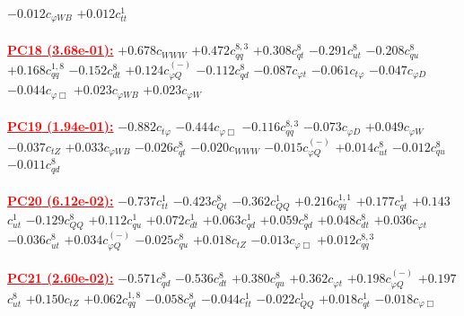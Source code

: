 \documentclass{article}
\begin{document}
{$-0.012$}{\rm $c_{\varphi WB}$} 
{$+0.012$}{\rm $c_{tt}^{1}$} 
 \nonumber \\ \nonumber \\ 
\noindent \textcolor{red}{\underline{\bf{PC18} (3.68e-01):}}
{$+0.678$}{\rm $c_{WWW}$} 
{$+0.472$}{\rm $c_{qq}^{8,3}$} 
{$+0.308$}{\rm $c_{qt}^{8}$} 
{$-0.291$}{\rm $c_{ut}^{8}$} 
{$-0.208$}{\rm $c_{qu}^{8}$} 
{$+0.168$}{\rm $c_{qq}^{1,8}$} 
{$-0.152$}{\rm $c_{dt}^{8}$} 
{$+0.124$}{\rm $c_{\varphi Q}^{(-)}$} 
{$-0.112$}{\rm $c_{qd}^{8}$} 
{$-0.087$}{\rm $c_{\varphi t}$} 
{$-0.061$}{\rm $c_{t \varphi}$} 
{$-0.047$}{\rm $c_{\varphi D}$} 
{$-0.044$}{\rm $c_{\varphi \Box}$} 
{$+0.023$}{\rm $c_{\varphi WB}$} 
{$+0.023$}{\rm $c_{\varphi W}$} 
 \nonumber \\ \nonumber \\ 
\noindent \textcolor{red}{\underline{\bf{PC19} (1.94e-01):}}
{$-0.882$}{\rm $c_{t \varphi}$} 
{$-0.444$}{\rm $c_{\varphi \Box}$} 
{$-0.116$}{\rm $c_{qq}^{8,3}$} 
{$-0.073$}{\rm $c_{\varphi D}$} 
{$+0.049$}{\rm $c_{\varphi W}$} 
{$-0.037$}{\rm $c_{tZ}$} 
{$+0.033$}{\rm $c_{\varphi WB}$} 
{$-0.026$}{\rm $c_{qt}^{8}$} 
{$-0.020$}{\rm $c_{WWW}$} 
{$-0.015$}{\rm $c_{\varphi Q}^{(-)}$} 
{$+0.014$}{\rm $c_{ut}^{8}$} 
{$-0.012$}{\rm $c_{qu}^{8}$} 
{$-0.011$}{\rm $c_{qd}^{8}$} 
 \nonumber \\ \nonumber \\ 
\noindent \textcolor{red}{\underline{\bf{PC20} (6.12e-02):}}
{$-0.737$}{\rm $c_{tt}^{1}$} 
{$-0.423$}{\rm $c_{Qt}^{8}$} 
{$-0.362$}{\rm $c_{QQ}^{1}$} 
{$+0.216$}{\rm $c_{qq}^{1,1}$} 
{$+0.177$}{\rm $c_{qt}^{1}$} 
{$+0.143$}{\rm $c_{ut}^{1}$} 
{$-0.129$}{\rm $c_{QQ}^{8}$} 
{$+0.112$}{\rm $c_{qu}^{1}$} 
{$+0.072$}{\rm $c_{dt}^{1}$} 
{$+0.063$}{\rm $c_{qd}^{1}$} 
{$+0.059$}{\rm $c_{qd}^{8}$} 
{$+0.048$}{\rm $c_{dt}^{8}$} 
{$+0.036$}{\rm $c_{\varphi t}$} 
{$-0.036$}{\rm $c_{ut}^{8}$} 
{$+0.034$}{\rm $c_{\varphi Q}^{(-)}$} 
{$-0.025$}{\rm $c_{qu}^{8}$} 
{$+0.018$}{\rm $c_{tZ}$} 
{$-0.013$}{\rm $c_{\varphi \Box}$} 
{$+0.012$}{\rm $c_{qq}^{8,3}$} 
 \nonumber \\ \nonumber \\ 
\noindent \textcolor{red}{\underline{\bf{PC21} (2.60e-02):}}
{$-0.571$}{\rm $c_{qd}^{8}$} 
{$-0.536$}{\rm $c_{dt}^{8}$} 
{$+0.380$}{\rm $c_{qu}^{8}$} 
{$+0.362$}{\rm $c_{\varphi t}$} 
{$+0.198$}{\rm $c_{\varphi Q}^{(-)}$} 
{$+0.197$}{\rm $c_{ut}^{8}$} 
{$+0.150$}{\rm $c_{tZ}$} 
{$+0.062$}{\rm $c_{qq}^{1,8}$} 
{$-0.058$}{\rm $c_{qt}^{8}$} 
{$-0.044$}{\rm $c_{tt}^{1}$} 
{$-0.022$}{\rm $c_{QQ}^{1}$} 
{$+0.018$}{\rm $c_{qt}^{1}$} 
{$-0.018$}{\rm $c_{\varphi \Box}$} 
\end{document}
